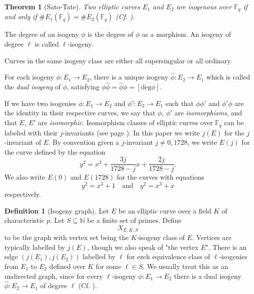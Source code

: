 \documentclass{article}
\theoremstyle{theorem}
\newtheorem{theorem}{Theorem}
\theoremstyle{definition}
\newtheorem{definition}{Definition}
\begin{document}
\begin{theorem}[Sato-Tate]
	Two elliptic curves $E_1$ and $E_2$ are isogenous over $\mathbb{F}_q$ if and only if $\#E_1(\mathbb{F}_q) = \#E_2(\mathbb{F}_q)$ (Cf. \cite[Theorem 13]{IsogenyCryptoDeFeo}). 
\end{theorem}  

The degree of an isogeny $\phi$ is the degree of $\phi$ as a morphism. An isogeny of degree $\ell$ is called $\ell$-isogeny. 

Curves in the same isogeny class are either all supersingular or all ordinary.



For each isogeny $\phi: E_1 \to E_2$, there is a unique isogeny $\hat{\phi}: E_2 \to E_1$ which is called the \textit{dual isogeny} of $\phi$, satisfying $\phi\hat{\phi} = \hat{\phi}\phi = [\mathrm{deg}\phi]$. 

If we have two isogenies $\phi: E_1 \to E_2$ and $\phi': E_2 \to E_1$ such that $\phi\phi'$ and $\phi'\phi$ are the identity in their respective curves, we say that $\phi$, $\phi'$ are \textit{isomorphisms}, and that $E$, $E'$ are \textit{isomorphic}. Isomorphism classes of elliptic curves over $\mathbb{F}_q$ can be labeled with their $j$-invariants (see page \pageref{j-invariant}). In this paper we write $j(E)$ for the $j$-invariant of $E$. By convention given a $j$-invariant $j \neq 0, 1728$, we write $E(j)$ for the curve defined by the equation 
	\[y^2 = x^3 + \frac{3j}{1728 - j}x + \frac{2j}{1728 - j}. \]
We also write $E(0)$ and $E(1728)$ for the curves with equations
	\[y^2 = x^3 + 1 \quad \text{and} \quad y^2 = x^3 +x \]
respectively.

	\begin{definition}[Isogeny graph]
		Let $E$ be an elliptic curve over a field $K$ of characteristic $p$. Let $S \subseteq \mathbb{N}$ be a finite set of primes. Define
			\[X_{E, K, S} \]
		to be the graph with vertex set being the $K$-isogeny class of $E$. Vertices are typically labelled by $j(E)$, though we also speak of "the vertex $E$". There is an edge $(j(E_1), j(E_2))$ labelled by $\ell$ for ezch equivalence class of $\ell$-isogenies from $E_1$ to $E_2$ defined over $K$ for some $\ell \in S$. We usually treat this as an undirected graph, since for every $\ell$-isogeny $\phi: E_1 \to E_2$ there is a dual isogeny $\hat{\phi}: E_2 \to E_1$ of degree $\ell$ (Cf. \cite[25.2]{Galbraith-PKC}). 
	\end{definition}
\end{document}

